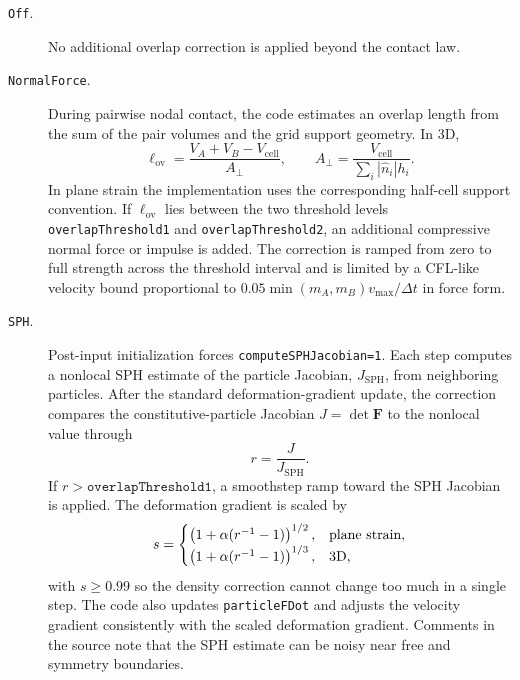 \begin{description}
  \item[\texttt{Off}.] No additional overlap correction is applied beyond the contact law.

  \item[\texttt{NormalForce}.] During pairwise nodal contact, the code estimates an overlap length from the sum of the pair volumes and the grid support geometry.  In 3D,
  \begin{equation}
    \ell_{\mathrm{ov}}=\frac{V_A+V_B-V_{\mathrm{cell}}}{A_{\perp}},
    \qquad
    A_{\perp}=\frac{V_{\mathrm{cell}}}{\sum_i |\hat n_i|h_i}.
  \end{equation}
  In plane strain the implementation uses the corresponding half-cell support convention.  If $\ell_{\mathrm{ov}}$ lies between the two threshold levels \texttt{overlapThreshold1} and \texttt{overlapThreshold2}, an additional compressive normal force or impulse is added.  The correction is ramped from zero to full strength across the threshold interval and is limited by a CFL-like velocity bound proportional to $0.05\min(m_A,m_B)v_{\max}/\Delta t$ in force form.

  \item[\texttt{SPH}.] Post-input initialization forces \texttt{computeSPHJacobian=1}.  Each step computes a nonlocal SPH estimate of the particle Jacobian, $J_{\mathrm{SPH}}$, from neighboring particles.  After the standard deformation-gradient update, the correction compares the constitutive-particle Jacobian $J=\det\mathbf{F}$ to the nonlocal value through
  \begin{equation}
    r=\frac{J}{J_{\mathrm{SPH}}}.
  \end{equation}
  If $r>\texttt{overlapThreshold1}$, a smoothstep ramp toward the SPH Jacobian is applied.  The deformation gradient is scaled by
  \begin{equation}
    s=\begin{cases}
      \left(1+\alpha(r^{-1}-1)\right)^{1/2}, & \hbox{plane strain},\\
      \left(1+\alpha(r^{-1}-1)\right)^{1/3}, & \hbox{3D},
    \end{cases}
  \end{equation}
  with $s\ge0.99$ so the density correction cannot change too much in a single step.  The code also updates \texttt{particleFDot} and adjusts the velocity gradient consistently with the scaled deformation gradient.  Comments in the source note that the SPH estimate can be noisy near free and symmetry boundaries.


\end{description}
